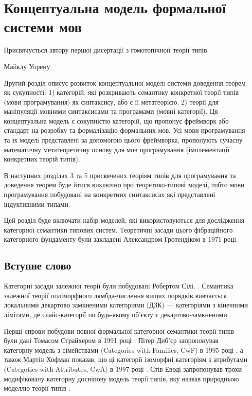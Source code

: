 
\chapter{Концептуальна модель формальної системи мов}
\epigraph{Присвячується автору першої дисертації з гомотопічноїї теорії типів}{Майклу Уорену}

Другий розділ описує розвиток концептуальної моделі системи доведення теорем як сукупності:
1) категорій, які розкривають семантику конкретної теорії типів (мови програмування) як синтаксису, або є її метатеорією.
2) теорії для маніпуляції мовними синтаксисами та програмами (мовні категорії).
Ця концептуальна модель є сокупністю категорій, що пропонує фреймворк або стандарт
на розробку та формалізацію формальних мов. Усі мови програмування та їх моделі представлені
за допомогою цього фреймворка, пропонують сучасну математичну метатеоретичну основу для
мов програмування (імплементації конкретних теорій типів).

В наступних розділах 3 та 5 присвячених теоріям типів для програмування та доведення теорем
буде йтися виключно про теоретико-типові моделі, тобто мови програмування побудовані
на конкретних синтаксисах які представлені індуктивними типами.

Цей розділ буде включати набір моделей, які використовуються для дослідження категорної семантики типових систем.
Теоретичні засади цього фібраційного категорного фундаменту були закладені Александром
Гротендіком в 1971 році.

\newpage
\section*{Вступне слово}
Категорні засади залежної теорії були побудовані Робертом Сілі. \cite{Seely84}.
Семантика залежної теорії поліморфного лямбда-числення вищих порядків
вивчається локальними декартово замкненими категоріями (ДЗК) --- категоріями з кінечними лімітами,
де слайс-категорії по будь-якому об'єкту є декартово-замкненими.

Перші спрови побудови повної формальної категорної семантики теорії типів були дані
Томасом Страйхером в 1991 році \cite{Streicher91}. Пітер Диб'єр запропонував категорну модель з
сімействами (Categories with Families, CwF) в 1995 році \cite{Dybjer95}, а також Мартін Хофман показав, що ці
категорії ізоморфні категоріям з атрибутами (Categoties with Attributes, CwA) в 1997 році \cite{Hofmann97}.
Стів Еводі запропонував трохи модифіковану категорну досніпову модель теорії типів,
яку назвав природньою моделлю теорії типів \cite{Awodey17NaturalModels}.

